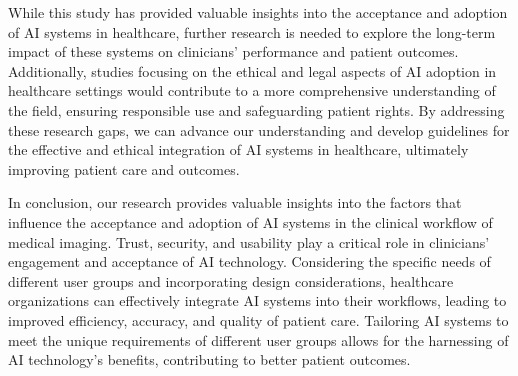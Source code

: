 While this study has provided valuable insights into the acceptance and adoption of \ac{AI} systems in healthcare, further research is needed to explore the long-term impact of these systems on clinicians' performance and patient outcomes.
Additionally, studies focusing on the ethical and legal aspects of \ac{AI} adoption in healthcare settings would contribute to a more comprehensive understanding of the field, ensuring responsible use and safeguarding patient rights.
By addressing these research gaps, we can advance our understanding and develop guidelines for the effective and ethical integration of \ac{AI} systems in healthcare, ultimately improving patient care and outcomes.

In conclusion, our research provides valuable insights into the factors that influence the acceptance and adoption of \ac{AI} systems in the clinical workflow of medical imaging.
Trust, security, and usability play a critical role in clinicians' engagement and acceptance of \ac{AI} technology.
Considering the specific needs of different user groups and incorporating design considerations, healthcare organizations can effectively integrate \ac{AI} systems into their workflows, leading to improved efficiency, accuracy, and quality of patient care.
Tailoring \ac{AI} systems to meet the unique requirements of different user groups allows for the harnessing of \ac{AI} technology's benefits, contributing to better patient outcomes.